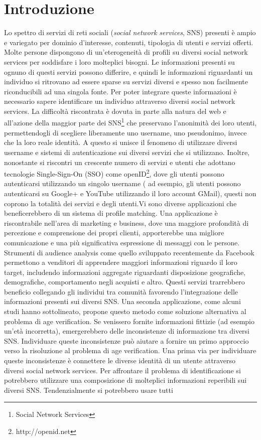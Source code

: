 \chapter{Introduzione}
\label{cap1}

Lo spettro di servizi di reti sociali (\textit{social network services}, SNS) presenti è ampio e variegato per dominio d'interesse, contenuti, tipologia di utenti e servizi offerti. Molte persone dispongono di un'eterogeneità di profili su diversi social network services per soddisfare i loro molteplici bisogni. Le informazioni presenti su ognuno di questi servizi possono differire, e quindi le informazioni riguardanti un individuo si ritrovano ad essere sparse su servizi diversi e spesso non facilmente riconducibili ad una singola fonte. Per poter integrare queste informazioni è necessario sapere identificare un individuo attraverso diversi social network services. La difficoltà riscontrata è dovuta in parte alla natura del web e all'azione della maggior parte dei SNS\footnote{Social Network Services} che preservano l'anonimità dei loro utenti, permettendogli di scegliere liberamente uno username, uno pseudonimo, invece che la loro reale identità. A questo si unisce il fenomeno di utilizzare diversi username e sistemi di autenticazione sui diversi servizi che si utilizzano. Inoltre, nonostante si riscontri un crescente numero di servizi e utenti\cite{openidtrend} che adottano tecnologie Single-Sign-On (SSO) come openID\footnote{http://openid.net}, dove gli utenti possono autenticarsi utilizzando un singolo username ( ad esempio, gli utenti possono autenticarsi su Google+ e YouTube utilizzando il loro account GMail), questi non coprono la totalità dei servizi e degli utenti.\newline Vi sono diverse applicazioni che beneficerebbero di un sistema di profile matching. Una applicazione è riscontrabile nell'area di marketing e business, dove una maggiore profondità di percezione e comprensione dei propri clienti, apporterebbe una migliore comunicazione e una più significativa espressione di messaggi con le persone. Strumenti di audience analysis come quello sviluppato recentemente da Facebook\cite{fbinsights} permettono a venditori di apprendere maggiori informazioni riguardo il loro target, includendo informazioni aggregate riguardanti disposizione geografiche, demografiche, comportamento negli acquisti e altro. Questi servizi trarrebbero beneficio collegando gli individui tra comunità favorendo l'integrazione delle informazioni presenti sui diversi SNS. Una seconda applicazione, come alcuni studi hanno sottolineato\cite{zafarani13}, propone questo metodo come soluzione alternativa al problema di age verification. Se venissero fornite informazioni fittizie (ad esempio un'età incorretta), emergerebbero delle inconsistenze di informazione tra diversi SNS. Individuare queste inconsistenze può aiutare a fornire un primo approccio verso la risoluzione al problema di age verification. Una prima via per individuare queste inconsistenze è connettere le diverse identità di un utente attraverso diversi social network services. Per affrontare il problema di identificazione si potrebbero utilizzare una composizione di molteplici informazioni reperibili sui diversi SNS. Tendenzialmente si potrebbero usare tutti 